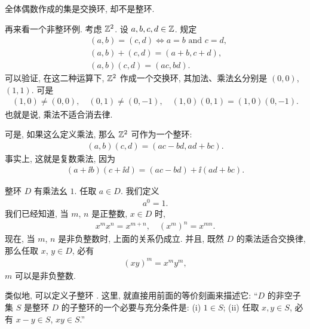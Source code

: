 \begin{example}
    全体偶数作成的集是交换环, 却不是整环.
\end{example}

\begin{example}
    再来看一个非整环例. 考虑 $\mathbb{Z}^2$. 设 $a,b,c,d \in \mathbb{Z}$. 规定
    \begin{align*}
         & (a,b) = (c,d) \iff a = b \text{ and } c = d, \\
         & (a,b) + (c,d) = (a+b,c+d),                   \\
         & (a,b)(c,d) = (ac,bd).
    \end{align*}
    可以验证, 在这二种运算下, $\mathbb{Z}^2$ 作成一个交换环, 其加法、乘法幺分别是 $(0,0)$, $(1,1)$. 可是
    \begin{align*}
        (1,0) \neq (0,0), \quad (0,1) \neq (0,-1), \quad (1,0)(0,1) = (1,0)(0,-1).
    \end{align*}
    也就是说, 乘法不适合消去律.
\end{example}

\begin{remark}
    可是, 如果这么定义乘法, 那么 $\mathbb{Z}^2$ 可作为一个整环:
    \begin{align*}
        (a,b)(c,d) = (ac-bd,ad+bc).
    \end{align*}
    事实上, 这就是复数乘法, 因为
    \begin{align*}
        (a+ \ii b)(c+ \ii d) = (ac-bd) + \ii (ad+bc).
    \end{align*}
\end{remark}

\begin{remark}
    整环 $D$ 有乘法幺 $1$. 任取 $a \in D$. 我们定义
    \begin{align*}
        a^0 = 1.
    \end{align*}
    我们已经知道, 当 $m$, $n$ 是正整数, $x \in D$ 时,
    \begin{align*}
        x^m x^n = x^{m+n}, \quad (x^m)^n = x^{mn}.
    \end{align*}
    现在, 当 $m$, $n$ 是非负整数时, 上面的关系仍成立. 并且, 既然 $D$ 的乘法适合交换律, 那么任取 $x$, $y \in D$, 必有
    \begin{align*}
        (xy)^m = x^m y^m,
    \end{align*}
    $m$ 可以是非负整数.
\end{remark}

\begin{remark}
    类似地, 可以定义子整环 . 这里, 就直接用前面的等价刻画来描述它: ``$D$ 的非空子集 $S$ 是整环 $D$ 的子整环的一个必要与充分条件是: (i) $1 \in S$; (ii) 任取 $x,y \in S$, 必有 $x-y \in S$, $xy \in S$.''
\end{remark}

